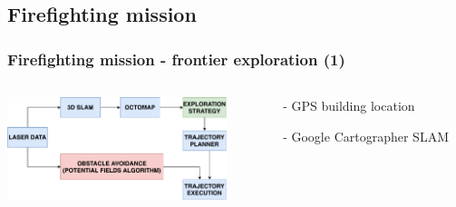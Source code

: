 \subsection{Firefighting mission}
\begin{frame}
	\frametitle{Firefighting mission - frontier exploration (1)}
	\begin{columns}
		\begin{column}{0.5\textwidth}\centering
			\begin{center}
				\includegraphics[height=3cm]{figures/3D_strategy}
				\label{fig:forest_uav}
			\end{center}
		\end{column}
		\begin{column}{0.4\textwidth}\centering
		\begin{itemize}
			\item[-] GPS building location
			\item[-] Google Cartographer SLAM
		\end{itemize}
		\end{column}
	\end{columns}
\end{frame}


